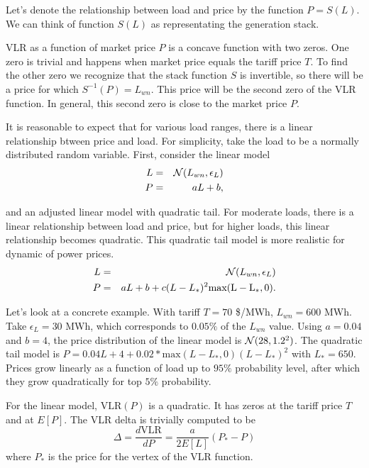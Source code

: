 \documentclass[12pt]{article}
\begin{document}
Let's denote the relationship between load and price by the function
$P=S(L)$.  We can think of function $S(L)$ as representating the
generation stack.

VLR as a function of market price $P$ is a concave function with two
zeros.  One zero is trivial and happens when market price equals the
tariff price $T$.  To find the other zero we recognize that the stack
function $S$ is invertible, so there will be a price for which
$S^{-1}(P) = L_{wn}$.  This price will be the second zero of the VLR
function.  In general, this second zero is close to the market price
$P$.

It is reasonable to expect that for various load ranges, there is a
linear relationship btween price and load.  For simplicity, take the
load to be a normally distributed random variable.  First, consider
the linear model
\begin{eqnarray}
  L &=& {\cal N}(L_{wn}, \epsilon_L)  \\
  P &=& a L + b,
\end{eqnarray}

and an adjusted linear model with quadratic tail.  For moderate loads,
there is a linear relationship between load and price, but for higher
loads, this linear relationship becomes quadratic.  This quadratic
tail model is more realistic for dynamic of power prices.
\begin{eqnarray}
  L &=& {\cal N}(L_{wn}, \epsilon_L)  \\
  P &=& a L + b + c(L-L_*)^2\mathrm{max(L-L_*,0)}.
\end{eqnarray}

Let's look at a concrete example.  With tariff $T=70$ \$/MWh, $L_{wn}
= 600$ MWh.  Take $\epsilon_L = 30$ MWh, which corresponds to $0.05\%$
of the $L_{wn}$ value.  Using $a=0.04$ and $b=4$, the price
distribution of the linear model is ${\cal N}(28,1.2^2)$.  The
quadratic tail model is $P = 0.04L + 4 +
0.02*\mathrm{max}(L-L_*,0)(L-L_*)^2$ with $L_*=650$.  Prices grow
linearly as a function of load up to $95\%$ probability level, after
which they grow quadratically for top $5\%$ probability.

For the linear model, $\mathrm{VLR}(P)$ is a quadratic.  It has zeros at the
tariff price $T$ and at $E[P]$.  The VLR delta is trivially computed
to be
\begin{equation}
  \Delta = \frac{d\mathrm{VLR}}{dP} = \frac{a}{2E[L]}(P_* - P) 
\end{equation}
where $P_*$ is the price for the vertex of the VLR function. 
\end{document}
